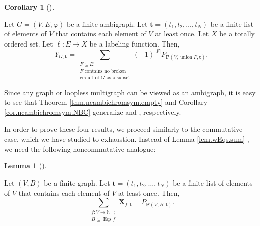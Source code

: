 \documentclass[numbers=enddot,12pt,final,onecolumn,notitlepage]{scrartcl}%
\theoremstyle{definition}
\newtheorem{lem}[theo]{Lemma}
\newenvironment{lemma}[1][]
{\begin{lem}[#1]\begin{leftbar}}
{\end{leftbar}\end{lem}}
\newtheorem{coro}[theo]{Corollary}
\newenvironment{corollary}[1][]
{\begin{coro}[#1]\begin{leftbar}}
{\end{leftbar}\end{coro}}
\let\sumnonlimits\sum
\renewcommand{\sum}{\sumnonlimits\limits}
\begin{document}
\begin{corollary}
\label{cor.ncambichromsym.NBC}Let $G=\left(  V,E,\varphi\right)  $ be a finite
ambigraph. Let $\mathbf{t}=\left(  t_{1},t_{2},\ldots,t_{N}\right)  $ be a
finite list of elements of $V$ that contains each element of $V$ at least
once. Let $X$ be a totally ordered set. Let $\ell:E\rightarrow X$ be a
labeling function. Then,%
\[
Y_{G,\mathbf{t}}=\sum_{\substack{F\subseteq E;\\F\text{ contains no
broken}\\\text{circuit of }G\text{ as a subset}}}\left(  -1\right)
^{\left\vert F\right\vert }P_{\mathbf{P}\left(  V,\operatorname*{union}%
F,\mathbf{t}\right)  }.
\]

\end{corollary}

Since any graph or loopless multigraph can be viewed as an ambigraph, it is
easy to see that Theorem \ref{thm.ncambichromsym.empty} and Corollary
\ref{cor.ncambichromsym.NBC} generalize \cite[Theorem 3.6]{GebSag01} and
\cite[Theorem 3.8]{GebSag01}, respectively.

In order to prove these four results, we proceed similarly to the commutative
case, which we have studied to exhaustion. Instead of Lemma \ref{lem.wEqs.sum}%
, we need the following noncommutative analogue:

\begin{lemma}
\label{lem.ncEqs.sum}Let $\left(  V,B\right)  $ be a finite graph. Let
$\mathbf{t}=\left(  t_{1},t_{2},\ldots,t_{N}\right)  $ be a finite list of
elements of $V$ that contains each element of $V$ at least once. Then,%
\[
\sum_{\substack{f:V\rightarrow\mathbb{N}_{+};\\B\subseteq\operatorname*{Eqs}%
f}}\mathbf{X}_{f,\mathbf{t}}=P_{\mathbf{P}\left(  V,B,\mathbf{t}\right)  }.
\]

\end{lemma}
\end{document}
